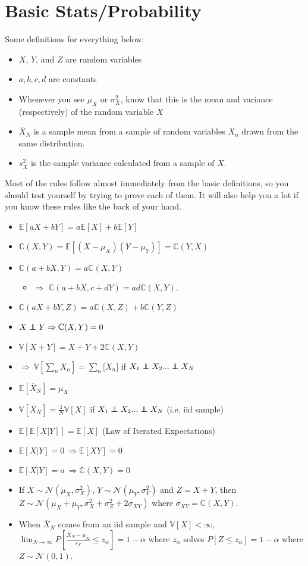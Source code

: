 \documentclass[12pt]{article}
\newcommand\ov{\overline}
\newcommand\BB{\mathbb}
\newcommand\EE{\mathbb{E}}
\newcommand\mc{\mathcal}
\numberwithin{equation}{section}
\numberwithin{figure}{section}
\numberwithin{table}{section}
\newcommand\independent{\protect\mathpalette{\protect\independenT}{\perp}}
\def\independenT#1#2{\mathrel{\rlap{$#1#2$}\mkern2mu{#1#2}}}
\begin{document}
\section*{Basic Stats/Probability}
Some definitions for everything below:
\begin{itemize}
  \item $X$, $Y$, and $Z$ are random variables
  \item $a,b,c,d$ are constants
  \item Whenever you see $\mu_{X}$ or $\sigma^2_{X}$, know that this is the mean and variance (respectively) of the random variable $X$
  \item $\ov{X}_{N}$ is a sample mean from a sample of random variables $X_{n}$ drawn from the same distribution.
  \item $s^2_{X}$ is the sample variance calculated from a sample of $X$.
\end{itemize}
Most of the rules follow almost immediately from the basic definitions, so you should test yourself by trying to prove each of them. It will also help you a lot if you know these rules like the back of your hand.
\begin{itemize}
  \item $\EE[aX + bY] = a\EE[X] + b\EE[Y]$
  \item $\BB{C}(X,Y) = \EE[(X-\mu_{X})(Y-\mu_{Y})] = \BB{C}(Y,X)$
  \item $\BB{C}(a + bX,Y) = a\BB{C}(X,Y)$ 
   \begin{itemize}\item[] $\Rightarrow$ $\BB{C}(a+bX,c+dY) = ad\BB{C}(X,Y)$. \end{itemize}
  \item $\BB{C}(aX + bY,Z) = a\BB{C}(X,Z) + b\BB{C}(Y,Z)$
  \item $X \independent{Y} \Rightarrow \BB{C}(X,Y) = 0$
  \item $\BB{V}[X+Y] = X + Y + 2\BB{C}(X,Y)$
  \item $\Rightarrow\ \BB{V}\left[\sum_{n}X_{n}\right] = \sum_{n}\BB[X_{n}]$ if $X_{1}\independent X_{2}...\independent X_{N}$
  \item $\EE[\ov{X}_{N}] = \mu_{X}$
  \item $\BB{V}[\ov{X}_{N}] = \frac{1}{N}\BB{V}[X]$ if $X_{1}\independent X_{2}...\independent X_{N}$ (i.e. iid sample)
  \item $\EE[\EE[X|Y]] = \EE[X]$ (Law of Iterated Expectations)
  \item $\EE[X|Y]=0\ \Rightarrow \EE[XY] = 0$
  \item $\EE[X|Y] = a\ \Rightarrow \BB{C}(X,Y)=0$
  \item If $X\sim\mc{N}(\mu_{X},\sigma^2_{X})$, $Y\sim\mc{N}(\mu_{Y},\sigma^2_{Y})$ and $Z = X+Y$, then $Z\sim\mc{N}(\mu_{X}+\mu_{Y},\sigma^2_{X}+\sigma^2_{Z}+2\sigma_{XY})$ where $\sigma_{XY}=\BB{C}(X,Y)$.
  \item When $\ov{X}_{N}$ comes from an iid sample and $\BB{V}[X]<\infty$, $\lim_{N\rightarrow\infty}P\left[\frac{\ov{X}_{N}-\mu_{X}}{s_{X}}\leq z_{\alpha}\right] = 1-\alpha$ where $z_{\alpha}$ solves $P[Z\leq z_{\alpha}] = 1-\alpha$ where $Z\sim\mc{N}(0,1)$.
  \end{itemize}
\end{document}

